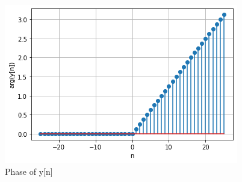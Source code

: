 \documentclass[journal,12pt,twocolumn]{IEEEtran}
\begin{document}
\begin{figure}[!htp]
    \centering
    \includegraphics[width = \columnwidth]{4.PNG}
    \caption{Phase of y[n]}
    \label{f4}
\end{figure}
\end{document}
